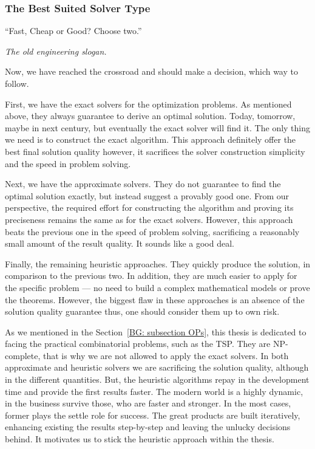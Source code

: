 \subsubsection{The Best Suited Solver Type}
\epigraph{``Fast, Cheap or Good? Choose two.''}{\textit{The old engineering slogan.}}

Now, we have reached the crossroad and should make a decision, which way to follow.

First, we have the exact solvers for the optimization problems. As mentioned above, they always guarantee to derive an optimal solution. Today, tomorrow, maybe in next century, but eventually the exact solver will find it. The only thing we need is to construct the exact algorithm. This approach definitely offer the best final solution quality however, it sacrifices the solver construction simplicity and the speed in problem solving.

Next, we have the approximate solvers. They do not guarantee to find the optimal solution exactly, but instead suggest a provably good one. From our perspective, the required effort for constructing the algorithm and proving its preciseness remains the same as for the exact solvers. However, this approach beats the previous one in the speed of problem solving, sacrificing a reasonably small amount of the result quality. It sounds like a good deal.

Finally, the remaining heuristic approaches. They quickly produce the solution, in comparison to the previous two. In addition, they are much easier to apply for the specific problem — no need to build a complex mathematical models or prove the theorems. However, the biggest flaw in these approaches is an absence of the solution quality guarantee thus, one should consider them up to own risk.

As we mentioned in the Section~\ref{BG: subsection OPs}, this thesis is dedicated to facing the practical combinatorial problems, such as the TSP. They are NP-complete, that is why we are not allowed to apply the exact solvers. In both approximate and heuristic solvers we are sacrificing the solution quality, although in the different quantities. But, the heuristic algorithms repay in the development time and provide the first results faster. The modern world is a highly dynamic, in the business survive those, who are faster and stronger. In the most cases, former plays the settle role for success. The great products are built iteratively, enhancing existing the results step-by-step and leaving the unlucky decisions behind. It motivates us to stick the heuristic approach within the thesis.

